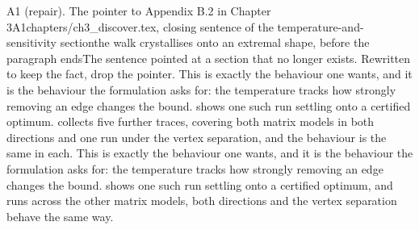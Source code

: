 \begin{offcutrewrite}{A1 (repair). The pointer to Appendix B.2 in Chapter 3}{A1}{chapters/ch3\_discover.tex, closing sentence of the temperature-and-sensitivity section}{the walk crystallises onto an extremal shape, before the paragraph ends}{The sentence pointed at a section that no longer exists. Rewritten to keep the fact, drop the pointer.}
This is exactly the behaviour one wants, and it is the behaviour the formulation asks for: the temperature tracks how strongly removing an edge changes the bound.  shows one such run settling onto a certified optimum.  collects five further traces, covering both matrix models in both directions and one run under the vertex separation, and the behaviour is the same in each.
\nowreads
This is exactly the behaviour one wants, and it is the behaviour the formulation asks for: the temperature tracks how strongly removing an edge changes the bound.  shows one such run settling onto a certified optimum, and runs across the other matrix models, both directions and the vertex separation behave the same way.
\end{offcutrewrite}

